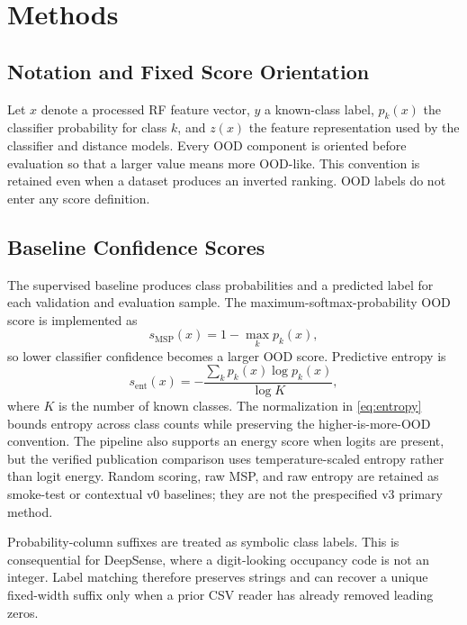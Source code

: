 \section{Methods}
\label{sec:methods}

\subsection{Notation and Fixed Score Orientation}

Let \(x\) denote a processed RF feature vector, \(y\) a known-class label, \(p_k(x)\) the classifier probability for class \(k\), and \(z(x)\) the feature representation used by the classifier and distance models. Every OOD component is oriented before evaluation so that a larger value means more OOD-like. This convention is retained even when a dataset produces an inverted ranking. OOD labels do not enter any score definition.

\subsection{Baseline Confidence Scores}

The supervised baseline produces class probabilities and a predicted label for each validation and evaluation sample. The maximum-softmax-probability OOD score is implemented as
\begin{equation}
  s_{\mathrm{MSP}}(x) = 1 - \max_k p_k(x),
  \label{eq:msp}
\end{equation}
so lower classifier confidence becomes a larger OOD score. Predictive entropy is
\begin{equation}
  s_{\mathrm{ent}}(x)
  = -\frac{\sum_k p_k(x)\log p_k(x)}{\log K},
  \label{eq:entropy}
\end{equation}
where \(K\) is the number of known classes. The normalization in \eqref{eq:entropy} bounds entropy across class counts while preserving the higher-is-more-OOD convention. The pipeline also supports an energy score when logits are present, but the verified publication comparison uses temperature-scaled entropy rather than logit energy. Random scoring, raw MSP, and raw entropy are retained as smoke-test or contextual v0 baselines; they are not the prespecified v3 primary method.

Probability-column suffixes are treated as symbolic class labels. This is consequential for DeepSense, where a digit-looking occupancy code is not an integer. Label matching therefore preserves strings and can recover a unique fixed-width suffix only when a prior CSV reader has already removed leading zeros.

